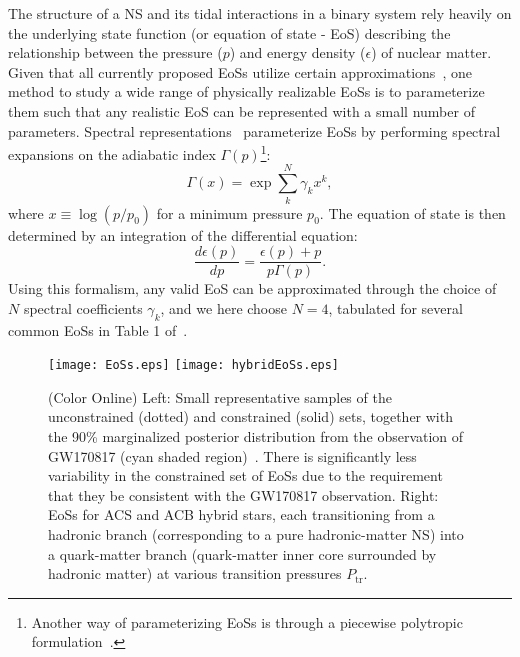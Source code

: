 \documentclass[prd,twocolumn,nofootinbib,superscriptaddress,amsmath,amssymb]{revtex4-1}
\begin{document}
The structure of a NS and its tidal interactions in a binary system rely heavily on the underlying state function (or equation of state - EoS) describing the relationship between the pressure ($p$) and energy density ($\epsilon$) of nuclear matter.
Given that all currently proposed EoSs utilize certain approximations~\cite{Oertel:Review,Baym:Review}, one method to study a wide range of physically realizable EoSs is to parameterize them such that any realistic EoS can be represented with a small number of parameters.
Spectral representations~\cite{Lindblom:2010bb,Lindblom:2012zi,Lindblom:2013kra,Lindblom:2018rfr,Abbott:2018exr} parameterize EoSs by performing spectral expansions on the adiabatic index $\Gamma(p)$\footnote{Another way of parameterizing EoSs is through a piecewise polytropic formulation~\cite{Read2009,Lackey:2014fwa,Carney:2018sdv}.}:
\begin{equation}
\Gamma(x) = \exp{\sum_k^{N}\gamma_k x^k},
\end{equation}
where $x \equiv \log{(p/p_0)}$ for a minimum pressure $p_0$.
The equation of state is then determined by an integration of the differential equation:
\begin{equation}
\frac{d \epsilon(p)}{dp}=\frac{\epsilon(p)+p}{p \Gamma(p)}.
\end{equation}
Using this formalism, any valid EoS can be approximated through the choice of $N$ spectral coefficients $\gamma_k$, and we here choose $N=4$, tabulated for several common EoSs in Table 1 of~\cite{Lindblom:2018rfr}.

\begin{figure*}
\begin{center} 
\texttt{[image: EoSs.eps]}
\texttt{[image: hybridEoSs.eps]}
\end{center}
\caption{(Color Online) Left: Small representative samples of the unconstrained (dotted) and constrained (solid) sets, together with the 90\% marginalized posterior distribution from the observation of GW170817 (cyan shaded region)~\cite{LIGO:posterior}. There is significantly less variability in the constrained set of EoSs due to the requirement that they be consistent with the GW170817 observation. Right: EoSs for ACS and ACB hybrid stars, each transitioning from a hadronic branch (corresponding to a pure hadronic-matter NS) into a quark-matter branch (quark-matter inner core surrounded by hadronic matter) at various transition pressures $P_{\text{tr}}$.
}
\label{fig:eos}
\end{figure*} 
\end{document}
